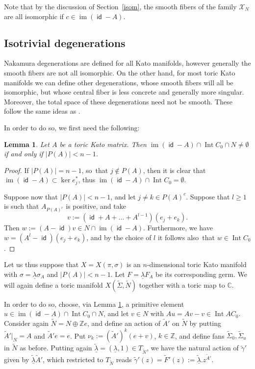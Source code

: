 \documentclass[JEP,XML,SOM,Unicode,NoFloatCountersInSection]{cedram}
\let\mathcal\mathscr
\newtheorem{lemma}[theorem]{Lemma}
\theoremstyle{definition}
\let\wt\widetilde
\let\la\lambda
\let\un\underline
\newcommand{\CC}{\mathbb{C}}
\newcommand{\ZZ}{\mathbb{Z}}
\DeclareMathOperator{\id}{\mathsf{id}}
\DeclareMathOperator{\im}{im}
\DeclareMathOperator{\Int}{Int}
\begin{document}
Note that by the discussion of Section~\ref{isom}, the smooth fibers of the family $\mathcal{X}_N$ are all isomorphic if $c\in\im(\id-A)$.

\subsection{Isotrivial degenerations} Nakamura degenerations are defined for all Kato manifolds, however generally the smooth fibers are not all isomorphic. On the other hand, for most toric Kato manifolds we can define other degenerations, whose smooth fibers will all be isomorphic, but whose central fiber is less concrete and generally more singular. Moreover, the total space of these degenerations need not be smooth. These follow the same ideas as \cite[\S 2]{tsu}.

In order to do so, we first need the following:
\begin{lemma}\label{intv}
Let $A$ be a toric Kato matrix. Then $\im(\id-A)\cap \Int C_0\cap N\neq\emptyset$ if and only if $|P(A)|<n-1$.
\end{lemma}
\begin{proof}
If $|P(A)|=n-1$, so~that $j\notin P(A)$, then it is clear that $\im(\id-A)\subset\ker e_j^*$, thus $\im(\id-A)\cap \Int C_0=\emptyset$.

Suppose now that $|P(A)|<n-1$, and let $j\neq k\in P(A)^c$. Suppose that $l\geq 1$ is such that $A_{P(A)^c}$ is positive, and take
\begin{equation*}
v:=(\id+A+\ldots+A^{l-1})(e_j+e_k).
\end{equation*}
Then $w:=(A-\id)v\in N\cap \im(\id-A)$. Furthermore, we have $w=(A^l-\id)(e_j+e_k)$, and by the choice of $l$ it follows also~that $w\in\Int C_0$.
\end{proof}

Let us thus suppose that $X=X(\pi,\sigma)$ is an $n$-dimensional toric Kato manifold with $\sigma=\un\la\sigma_A$ and $|P(A)|<n-1$. Let $F=\un\la F_A$ be its corresponding germ. We will again define a toric manifold $X(\wt{\Sigma},\wt{N})$ together with a toric map to $\CC$.

In order to do so, choose, via Lemma \ref{intv}, a primitive element $u\in \im(\id-A)\cap \Int C_0\cap N$, and let $v\in N$ with $Au=Av-v\in\Int AC_0$. Consider again $\wt{N}=N\oplus \ZZ e$, and define an action of $\wt{A}'$ on $\wt{N}$ by putting $\wt{A}'|_N=A$ and $\wt{A}'e=e$. Put $\nu_k:=(\wt{A}')^k(e+v)$, $k\in\ZZ$, and define fans $\wt{\Sigma}_0,\wt{\Sigma}_u$ in $\wt{N}$ as before. Putting again $\wt{\un\la}=(\un\la, 1)\in T_{\wt{N}}$, we have the natural action of $\wt{\gamma}'$ given by $\wt{\un\la}\wt{A}'$, which restricted to $T_{\wt{N}}$ reads $\wt{\gamma}'(z)=\wt{F}'(z):=\wt{\un\la}. z^{\wt{A}'}$.
\end{document}
